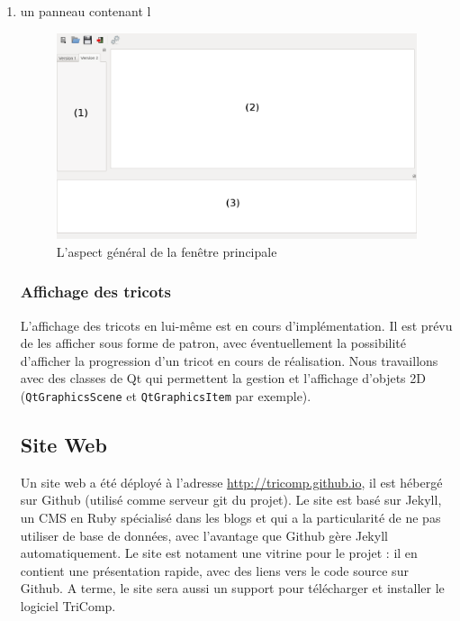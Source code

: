 \documentclass{article}
\begin{document}
\begin{enumerate}
   \item un panneau contenant l 
\begin{figure}[!h]
  \begin{center}
    \includegraphics[scale=0.3]{fenetre.png}
  \end{center}
  \caption{L'aspect général de la fenêtre principale}
  \label{fenetre}
\end{figure}

\subsubsection{Affichage des tricots}

L'affichage des tricots en lui-même est en cours d'implémentation. Il est prévu de les afficher sous forme de patron, avec éventuellement
la possibilité d'afficher la progression d'un tricot en cours de réalisation.
Nous travaillons avec des classes de Qt qui permettent la gestion et l'affichage d'objets 2D (\texttt{QtGraphicsScene} et \texttt
{QtGraphicsItem} par exemple).

\subsection{Site Web}

Un site web a été déployé à l'adresse \url{http://tricomp.github.io}, il est hébergé sur Github (utilisé comme serveur git du projet). Le
site est basé sur Jekyll, un CMS en Ruby spécialisé dans les blogs et qui a la particularité de ne pas utiliser de base de données, avec
l'avantage que Github gère Jekyll automatiquement. Le site est notament une vitrine pour le projet : il en contient une présentation
rapide, avec des liens vers le code source sur Github. A terme, le site sera aussi un support pour télécharger et installer le logiciel
TriComp.


\end{enumerate}
\end{document}
